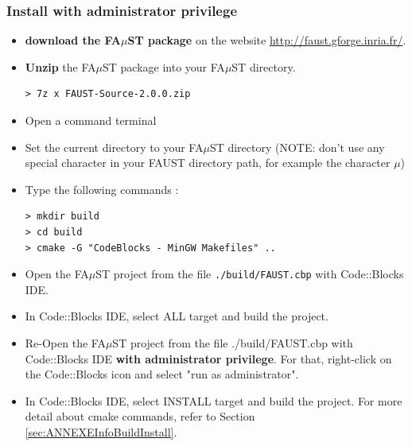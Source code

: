 \subsubsection{Install with administrator privilege}
\label{sec:WinMinGWCodeBlocksAdminBasicInstall}
\begin{itemize}
\item \textbf{download the FA$\mu$ST package} on the website  \url{http://faust.gforge.inria.fr/}. 
\item \textbf{Unzip} the FA$\mu$ST package into your FA$\mu$ST directory. 
\begin{lstlisting}
> 7z x FAUST-Source-2.0.0.zip
\end{lstlisting}
\item Open a command terminal
\item Set the current directory to your FA$\mu$ST directory (NOTE: don't use any special character in your FAUST directory path, for example the character $\mu$)
\item Type the following commands : 
\begin{lstlisting}
> mkdir build
> cd build
> cmake -G "CodeBlocks - MinGW Makefiles" .. 
\end{lstlisting}
\item Open the FA$\mu$ST project from the file \texttt{./build/FAUST.cbp} with Code::Blocks IDE.
\item In Code::Blocks IDE, select ALL target and build the project.
\item Re-Open the FA$\mu$ST project from the file ./build/FAUST.cbp with Code::Blocks IDE \textbf{with administrator privilege}. For that, right-click on the Code::Blocks icon and select "run as administrator". 
\item In Code::Blocks IDE, select INSTALL target and build the project.
For more detail about cmake commands, refer to Section \ref{sec:ANNEXEInfoBuildInstall}.
\end{itemize}

